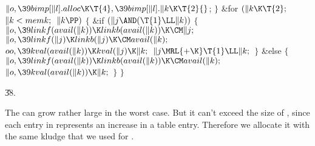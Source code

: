 ${}\|o,\39\\{bimp}[\|l].\\{alloc}\K\T{4},\39\\{bimp}[\|l].\|k\K\T{2}{}$;\6
\4${}\}{}$\2\6
\&{for} ${}(\|k\K\T{2};{}$ ${}\|k<\\{memk};{}$ ${}\|k\PP){}$\5
${}\{{}$\1\6
\&{if} ${}(\|j\AND(\T{1}\LL\|k)){}$\5
${}\{{}$\1\6
${}\|o,\39\\{linkf}(\\{avail}(\|k))\K\\{linkb}(\\{avail}(\|k))\K\CM\|j;{}$\6
${}\|o,\39\\{linkf}(\|j)\K\\{linkb}(\|j)\K\CM\\{avail}(\|k);{}$\6
${}\\{oo},\39\\{kval}(\\{avail}(\|k))\K\\{kval}(\|j)\K\|k;{}$\6
${}\|j\MRL{+{\K}}\T{1}\LL\|k;{}$\6
\4${}\}{}$\2\6
\&{else}\5
${}\{{}$\1\6
${}\|o,\39\\{linkf}(\\{avail}(\|k))\K\\{linkb}(\\{avail}(\|k))\K\CM\\{avail}(%
\|k);{}$\6
${}\|o,\39\\{kval}(\\{avail}(\|k))\K\|k;{}$\6
\4${}\}{}$\2\6
\4${}\}{}$\2\par
\U38.\fi

The  can grow rather large in the worst
case. But
it can't exceed the size of , since each entry in 
represents
an increase in a  table entry.
Therefore we allocate it with the same kludge that we used for .

